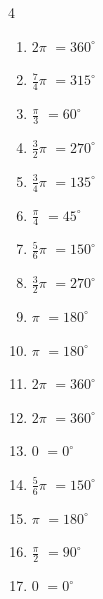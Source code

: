 \begin{multicols}{4}
\begin{enumerate}
  \item $\displaystyle 2\pi$
        $\displaystyle =360^{\circ}$

  \item $\displaystyle \frac{7}{4}\pi$
        $\displaystyle =315^{\circ}$

  \item $\displaystyle \frac{\pi}{3}$
        $\displaystyle =60^{\circ}$

  \item $\displaystyle \frac{3}{2}\pi$
        $\displaystyle =270^{\circ}$

  \item $\displaystyle \frac{3}{4}\pi$
        $\displaystyle =135^{\circ}$

  \item $\displaystyle \frac{\pi}{4}$
        $\displaystyle =45^{\circ}$

  \item $\displaystyle \frac{5}{6}\pi$
        $\displaystyle =150^{\circ}$

  \item $\displaystyle \frac{3}{2}\pi$
        $\displaystyle =270^{\circ}$

  \item $\displaystyle \pi$
        $\displaystyle =180^{\circ}$

  \item $\displaystyle \pi$
        $\displaystyle =180^{\circ}$

  \item $\displaystyle 2\pi$
        $\displaystyle =360^{\circ}$

  \item $\displaystyle 2\pi$
        $\displaystyle =360^{\circ}$

  \item $\displaystyle 0$
        $\displaystyle =0^{\circ}$

  \item $\displaystyle \frac{5}{6}\pi$
        $\displaystyle =150^{\circ}$

  \item $\displaystyle \pi$
        $\displaystyle =180^{\circ}$

  \item $\displaystyle \frac{\pi}{2}$
        $\displaystyle =90^{\circ}$

\columnbreak %

  \item $\displaystyle 0$
        $\displaystyle =0^{\circ}$


\end{enumerate}
\end{multicols}
